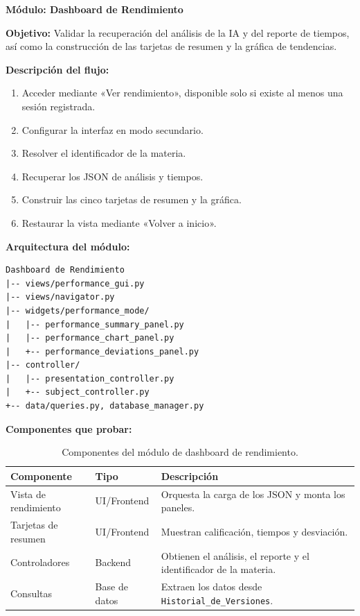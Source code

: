 \documentclass[11pt]{article}
\begin{document}
\clearpage
\textbf{Módulo: Dashboard de Rendimiento}

\textbf{Objetivo:} Validar la recuperación del análisis de la IA y del reporte de tiempos, así como la construcción de las tarjetas de resumen y la gráfica de tendencias.

\textbf{Descripción del flujo:}
\begin{enumerate}
\item Acceder mediante «Ver rendimiento», disponible solo si existe al menos una sesión registrada.
\item Configurar la interfaz en modo secundario.
\item Resolver el identificador de la materia.
\item Recuperar los JSON de análisis y tiempos.
\item Construir las cinco tarjetas de resumen y la gráfica.
\item Restaurar la vista mediante «Volver a inicio».
\end{enumerate}

\textbf{Arquitectura del módulo:}
\begin{verbatim}
Dashboard de Rendimiento
|-- views/performance_gui.py
|-- views/navigator.py
|-- widgets/performance_mode/
|   |-- performance_summary_panel.py
|   |-- performance_chart_panel.py
|   +-- performance_deviations_panel.py
|-- controller/
|   |-- presentation_controller.py
|   +-- subject_controller.py
+-- data/queries.py, database_manager.py
\end{verbatim}

\textbf{Componentes que probar:}
\begin{table}[H]
\centering
\begin{tabular}{|L{0.30\textwidth}|L{0.16\textwidth}|L{0.44\textwidth}|}
\hline
\textbf{Componente} & \textbf{Tipo} & \textbf{Descripción} \\ \hline
Vista de rendimiento & UI/Frontend & Orquesta la carga de los JSON y monta los paneles. \\ \hline
Tarjetas de resumen & UI/Frontend & Muestran calificación, tiempos y desviación. \\ \hline
Controladores & Backend & Obtienen el análisis, el reporte y el identificador de la materia. \\ \hline
Consultas & Base de datos & Extraen los datos desde \texttt{Historial\_de\_Versiones}. \\ \hline
\end{tabular}
\caption{Componentes del módulo de dashboard de rendimiento.}
\label{tab:componentes-modulo-dashboard}
\end{table}
\end{document}
